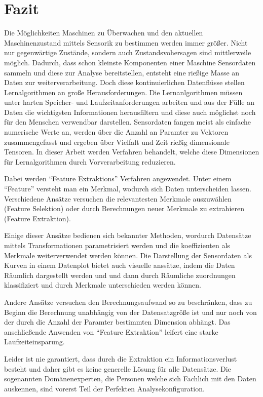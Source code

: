 \section{Fazit}
Die Möglichkeiten Maschinen zu Überwachen und den aktuellen Maschinenzustand mittels Sensorik zu bestimmen werden immer größer. Nicht nur gegenwärtige Zustände, sondern auch Zustandsvohersagen sind mittlerweile möglich. Dadurch, dass schon kleinste Komponenten einer Maschine Sensordaten sammeln und diese zur Analyse bereitstellen, entsteht eine rießige Masse an Daten zur weiterverarbeitung. Doch diese kontinuierlichen Datenflüsse stellen Lernalgorithmen an große Herausforderungen. 
Die Lernanlgorithmen müssen unter harten Speicher- und Laufzeitanforderungen arbeiten und aus der Fülle an Daten die wichtigsten Informationen herausfiltern und diese auch möglichst noch für den Menschen verwendbar darstellen. 
Sensordaten fangen meist als einfache numerische Werte an, werden über die Anzahl an Paramter zu Vektoren zusammengefasst und ergeben über Vielfalt und Zeit rießig dimensionale Tensoren. In dieser Arbeit werden Verfahren behandelt, welche diese Dimensionen für Lernalgorithmen durch Vorverarbeitung reduzieren.

Dabei werden \enquote{Feature Extraktions} Verfahren angewendet. Unter einem \enquote{Feature} versteht man ein Merkmal, wodurch sich Daten unterscheiden lassen. Verschiedene Ansätze versuchen die relevantesten Merkmale auszuwählen (Feature Selektion) oder durch Berechnungen neuer Merkmale zu extrahieren (Feature Extraktion). 

Einige dieser Ansätze bedienen sich bekannter Methoden, wordurch Datensätze mittels Transformationen parametrisiert werden und die koeffizienten als Merkmale weiterverwendet werden können. Die Darstellung der Sensordaten als Kurven in einem Datenplot bietet auch visuelle anssätze, indem die Daten Räumlich dargestellt werden und und dann durch Räumliche zuordnungen klassifiziert und durch Merkmale unterschieden werden können.

Andere Ansätze versuchen den Berechnungsaufwand so zu beschränken, dass zu Beginn die Berechnung unabhängig von der Datensatzgröße ist und nur noch von der durch die Anzahl der Paramter bestimmten Dimension abhängt. Das anschließende Anwenden von \enquote{Feature Extraktion} leifert eine starke Laufzeiteinsparung.

Leider ist nie garantiert, dass durch die Extraktion ein Informationsverlust besteht und daher gibt es keine generelle Lösung für alle Datensätze. Die sogenannten Domänenexperten, die Personen welche sich Fachlich mit den Daten auskennen, sind vorerst Teil der Perfekten Analysekonfiguration. 

